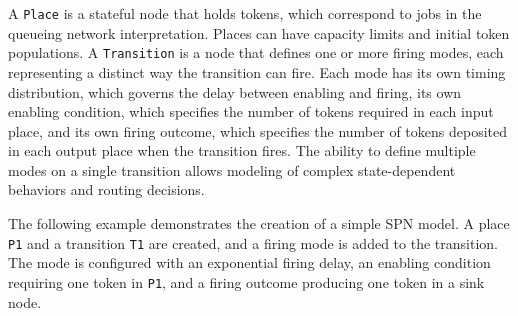 A \texttt{Place} is a stateful node that holds tokens, which correspond to jobs in the queueing network interpretation. Places can have capacity limits and initial token populations. A \texttt{Transition} is a node that defines one or more firing modes, each representing a distinct way the transition can fire. Each mode has its own timing distribution, which governs the delay between enabling and firing, its own enabling condition, which specifies the number of tokens required in each input place, and its own firing outcome, which specifies the number of tokens deposited in each output place when the transition fires. The ability to define multiple modes on a single transition allows modeling of complex state-dependent behaviors and routing decisions.

The following example demonstrates the creation of a simple SPN model. A place \texttt{P1} and a transition \texttt{T1} are created, and a firing mode is added to the transition. The mode is configured with an exponential firing delay, an enabling condition requiring one token in \texttt{P1}, and a firing outcome producing one token in a sink node.

